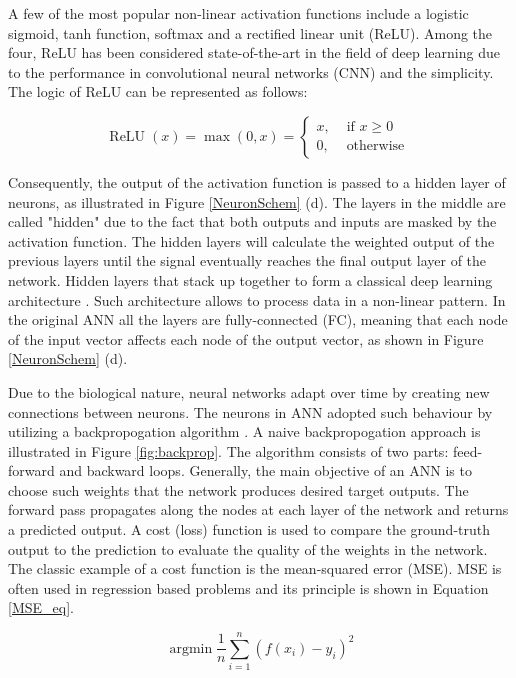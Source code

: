 A few of the most popular non-linear activation functions include a logistic sigmoid, tanh function, softmax and a rectified linear unit (ReLU). Among the four, ReLU has been considered state-of-the-art in the field of deep learning due to the performance in convolutional neural networks (CNN) \cite{Dubey2021} and the simplicity. The logic of ReLU can be represented as follows: 
  
\begin{equation}
	\operatorname{ReLU}(x)=\max (0, x)= \begin{cases}x, & \text { if } x \geq 0 \\ 0, & \text { otherwise }\end{cases}
\end{equation}

Consequently, the output of the activation function is passed to a hidden layer of neurons, as illustrated in Figure \ref{NeuronSchem} (d). The layers in the middle are called "hidden" due to the fact that both outputs and inputs are masked by the activation function.  The hidden layers will calculate the weighted output of the previous layers until the signal eventually reaches the final output layer of the network. Hidden layers that stack up together to form a classical deep learning architecture \cite{OShea2015}. Such architecture allows to process data in a non-linear pattern. In the original ANN all the layers are fully-connected (FC), meaning that each node of the input vector affects each node of the output vector, as shown in Figure \ref{NeuronSchem} (d).


Due to the biological nature, neural networks adapt over time by creating new connections between neurons. The neurons in ANN adopted such behaviour by utilizing a backpropogation algorithm \cite{Rumelhart:1986we}. A naive backpropogation approach is illustrated in Figure \ref{fig:backprop}. The algorithm consists of two parts: feed-forward and backward loops. Generally, the main objective of an ANN is to choose such weights that the network produces desired target outputs. The forward pass propagates along the nodes at each layer of the network and returns a predicted output. A cost (loss) function is used to compare the ground-truth output to the prediction to evaluate the quality of the weights in the network. The classic example of a cost function is the mean-squared error (MSE). MSE is often used in regression based problems and its principle is shown in Equation \ref{MSE_eq}.

\begin{equation}\label{MSE_eq} 
{\operatorname{argmin}} \frac{1}{n} \sum_{i=1}^{n}\left(f\left(x_{i}\right)-y_{i}\right)^{2}
\end{equation}

